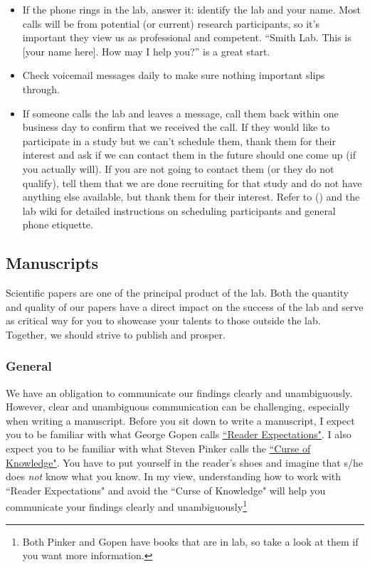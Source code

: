 \documentclass[letterpaper,11pt,oneside]{memoir}
\begin{document}
\begin{itemize}
\item If the phone rings in the lab, answer it: identify the lab and your name. Most calls will be from potential (or current) research participants, so it's important they view us as professional and competent. ``Smith Lab. This is [your name here]. How may I help you?'' is a great start. 
\item Check voicemail messages daily to make sure nothing important slips through.
\item If someone calls the lab and leaves a message, call them back within one business day to confirm that we received the call. If they would like to participate in a study but we can't schedule them, thank them for their interest and ask if we can contact them in the future should one come up (if you actually will). If you are not going to contact them (or they do not qualify), tell them that we are done recruiting for that study and do not have anything else available, but thank them for their interest. Refer to  () and the lab wiki for detailed instructions on scheduling participants and general phone etiquette.

\end{itemize}


\subsection{Manuscripts}
Scientific papers are one of the principal product of the lab. Both the quantity and quality of our papers have a direct impact on the success of the lab and serve as critical way for you to showcase your talents to those outside the lab. Together, we should strive to publish and prosper. 

\subsubsection{General}
\label{sec:ms_general}

We have an obligation to communicate our findings clearly and unambiguously. However, clear and unambiguous communication can be challenging, especially when writing a manuscript. Before you sit down to write a manuscript, I expect you to be familiar with what George Gopen calls \href{https://cseweb.ucsd.edu/~swanson/papers/science-of-writing.pdf}{``Reader Expectations"}. I also expect you to be familiar with what Steven Pinker calls the \href{https://stevenpinker.com/files/pinker/files/why_academics_stink_at_writing.pdf}{``Curse of Knowledge"}. You have to put yourself in the reader's shoes and imagine that s/he does \textit{not} know what you know. In my view, understanding how to work with ``Reader Expectations" and avoid the ``Curse of Knowledge" will help you communicate your findings clearly and unambiguously\footnote{Both Pinker and Gopen have books that are in lab, so take a look at them if you want more information.}
\end{document}
